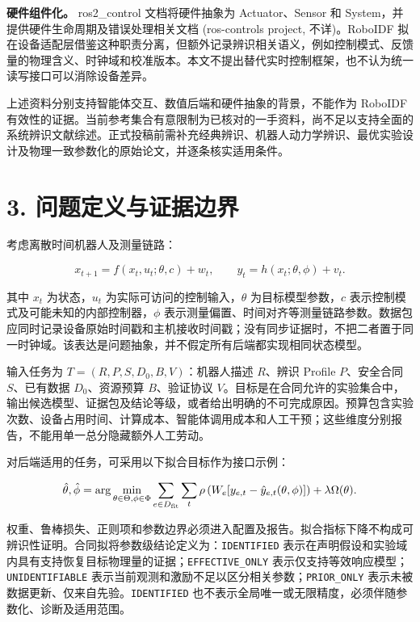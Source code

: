 \documentclass[
  chinese,
  11pt,
  a4paper,
  fontset=fandol]{ctexart}
\begin{document}
\textbf{硬件组件化。} ros2\_control 文档将硬件抽象为 Actuator、Sensor 和
System，并提供硬件生命周期及错误处理相关文档 ({ros-controls project},
不详)。RoboIDF
拟在设备适配层借鉴这种职责分离，但额外记录辨识相关语义，例如控制模式、反馈量的物理含义、时钟域和校准版本。本文不提出替代实时控制框架，也不认为统一读写接口可以消除设备差异。

上述资料分别支持智能体交互、数值后端和硬件抽象的背景，不能作为 RoboIDF
有效性的证据。当前参考集合有意限制为已核对的一手资料，尚不足以支持全面的系统辨识文献综述。正式投稿前需补充经典辨识、机器人动力学辨识、最优实验设计及物理一致参数化的原始论文，并逐条核实适用条件。

\section{3.
问题定义与证据边界}\label{ux95eeux9898ux5b9aux4e49ux4e0eux8bc1ux636eux8fb9ux754c}

考虑离散时间机器人及测量链路：

\[x_{t+1}=f(x_t,u_t;\theta,c)+w_t,\qquad
y_t=h(x_t;\theta,\phi)+v_t.\]

其中 \(x_t\) 为状态，\(u_t\) 为实际可访问的控制输入，\(\theta\)
为目标模型参数，\(c\) 表示控制模式及可能未知的内部控制器，\(\phi\)
表示测量偏置、时间对齐等测量链路参数。数据包应同时记录设备原始时间戳和主机接收时间戳；没有同步证据时，不把二者置于同一时钟域。该表达是问题抽象，并不假定所有后端都实现相同状态模型。

输入任务为 \(T=(R,P,S,D_0,B,V)\)：机器人描述 \(R\)、辨识 Profile
\(P\)、安全合同 \(S\)、已有数据 \(D_0\)、资源预算 \(B\)、验证协议
\(V\)。目标是在合同允许的实验集合中，输出候选模型、证据包及结论等级，或者给出明确的不可完成原因。预算包含实验次数、设备占用时间、计算成本、智能体调用成本和人工干预；这些维度分别报告，不能用单一总分隐藏额外人工劳动。

对后端适用的任务，可采用以下拟合目标作为接口示例：

\[\hat\theta,\hat\phi=\arg\min_{\theta\in\Theta,\phi\in\Phi}
\sum_{e\in D_{\rm fit}}\sum_t
\rho\left(W_e[y_{e,t}-\hat y_{e,t}(\theta,\phi)]\right)
+\lambda\Omega(\theta).\]

权重、鲁棒损失、正则项和参数边界必须进入配置及报告。拟合指标下降不构成可辨识性证明。合同拟将参数级结论定义为：\texttt{IDENTIFIED}
表示在声明假设和实验域内具有支持恢复目标物理量的证据；\texttt{EFFECTIVE\_ONLY}
表示仅支持等效响应模型；\texttt{UNIDENTIFIABLE}
表示当前观测和激励不足以区分相关参数；\texttt{PRIOR\_ONLY}
表示未被数据更新、仅来自先验。\texttt{IDENTIFIED}
也不表示全局唯一或无限精度，必须伴随参数化、诊断及适用范围。
\end{document}
